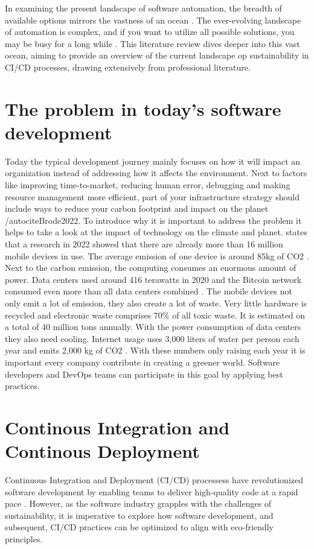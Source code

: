 In examining the present landscape of software automation, the breadth of available options mirrors the vastness of an ocean \autocite{King2019}.
The ever-evolving landscape of automation is complex, and if you want to utilize all possible solutions, you may be busy for a long while \autocite{King2019}.
This literature review dives deeper into this vast ocean, aiming to provide an overview of the current landscape op sustainability in CI/CD processes, drawing extensively from professional literature.



\section{The problem in today's software development}
Today the typical development journey mainly focuses on how it will impact an organization instead of addressing how it affects the environment. Next to factors like improving time-to-market, reducing human error, debugging and making resource management more efficient, part of your infrastructure strategy should include ways to reduce your carbon footprint and impact on the planet /autocite{Brode2022}. 
To introduce why it is important to address the problem it helps to take a look at the impact of technology on the climate and planet. \textcite{Brode2022} states that a research in 2022 showed that there are already more than 16 million mobile devices in use. The average emission of one device is around 85kg of CO2 \autocite{Six2023}. Next to the carbon emission, the computing consumes an enormous amount of power. Data centers used around 416 terawatts in 2020 and the Bitcoin network consumed even more than all data centers combined \textcite{Brode2022}. 
 The mobile devices not only emit a lot of emission, they also create a lot of waste. Very little hardware is recycled and electronic waste comprises 70\% of all toxic waste. It is estimated on a total of 40 million tons annually. With the power consumption of data centers they also need cooling. Internet usage uses 3,000 liters of water per person each year and emits 2,000 kg of CO2 \autocite{Brode2022}.
With these numbers only raising each year it is important every company contribute in creating a greener world. Software developers and DevOps teams can participate in this goal by applying best practices. 



\section{Continous Integration and Continous Deployment}
Continuous Integration and Deployment (CI/CD) processess have revolutionized software development by enabling teams to deliver high-quality code at a rapid pace \autocite{Sacolick2024}.
However, as the software industry grapples with the challenges of sustainability, it is imperative to explore how software development, and subsequent, CI/CD practices can be optimized to align with eco-friendly principles.

